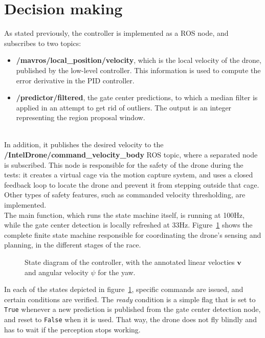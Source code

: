 \section{Decision making}

As stated previously, the controller is implemented as a ROS node, and
subscribes to two topics:
\begin{itemize}
	\item{\textbf{/mavros/local\_position/velocity}, which is the local velocity
	of the drone, published by the low-level controller. This information is
	used to compute the error derivative in the PID controller.}
	\item{\textbf{/predictor/filtered}, the gate center predictions, to which a
	median filter is applied in an attempt to get rid of outliers. The output
	is an integer representing the region proposal window.}
\end{itemize}

~\\In addition, it publishes the desired velocity to the
\textbf{/IntelDrone/command\_velocity\_body} ROS topic, where a separated node
is subscribed. This node is responsible for the safety of the drone during the
tests: it creates a virtual cage via the motion capture system, and uses a
closed feedback loop to locate the drone and prevent it from stepping outside
that cage. Other types of safety features, such as commanded velocity
thresholding, are implemented.\\

The main function, which runs the state machine itself, is running at 100Hz,
while the gate center detection is locally refreshed at 33Hz.
Figure~\ref{fig:state} shows the complete finite state machine responsible for
coordinating the drone's sensing and planning, in the different stages of the
race.

\begin{figure}[h]
	\centering
	
	\caption[State diagram of the controller.]{State diagram of the
	controller, with the annotated linear velocties $\mathbf{v}$ and angular
	velocity $\psi$ for the yaw.}
	\label{fig:state}
\end{figure}

In each of the states depicted in figure~\ref{fig:state}, specific commands are
issued, and certain conditions are verified. The \emph{ready} condition is a
simple flag that is set to \texttt{True} whenever a new prediction is published
from the gate center detection node, and reset to \texttt{False} when it is
used. That way, the drone does not fly blindly and has to wait if the
perception stops working.

